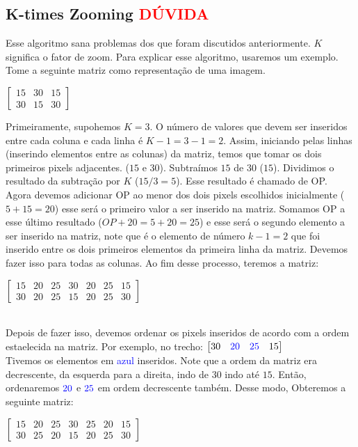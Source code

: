 \documentclass[a4paper, 12pt]{article}
\begin{document}
\subsection{K-times Zooming \textcolor{red}{DÚVIDA}}
Esse algoritmo sana problemas dos que foram discutidos anteriormente. $K$ significa o fator de zoom.
Para explicar esse algoritmo, usaremos um exemplo. Tome a seguinte matriz como representação de uma imagem.
\begin{table}[!htbp]
	\centering
	$
	\begin{bmatrix}
	15 & 30 & 15 \\
	30 & 15 & 30
	\end{bmatrix}
	$
\end{table}
Primeiramente, supohemos $K = 3$. O número de valores que devem ser inseridos entre cada coluna e cada linha é $K - 1 = 3 - 1 = 2$.
Assim, iniciando pelas linhas (inserindo elementos entre as colunas) da matriz, temos que tomar os dois primeiros pixels 
adjacentes. ($15$ e $30$).
Subtraímos $15$ de $30$ ($15$). Dividimos o resultado da subtração por $K$ ($15/3 = 5$). Esse resultado é chamado de OP.
Agora devemos adicionar OP ao menor dos dois pixels escolhidos inicialmente ($5 + 15 = 20$) esse será o primeiro valor 
a ser inserido na matriz. Somamos OP a esse último resultado ($OP + 20 = 5 + 20 = 25$) e esse será o segundo elemento a ser
inserido na matriz, note que é o elemento de número $k - 1 = 2$ que foi inserido entre os dois primeiros elementos da primeira 
linha da matriz. Devemos fazer isso para todas as colunas. Ao fim desse processo, teremos a matriz:
\begin{table}[!htbp]
	\centering
	$
	\begin{bmatrix}
	15 & 20 & 25 & 30 & 20 & 25 & 15 \\
	30 & 20 & 25 & 15 & 20 & 25 & 30
	\end{bmatrix}
	$
\end{table}
\\
Depois de fazer isso, devemos ordenar os pixels inseridos de acordo com a ordem estaelecida na matriz. Por exemplo, no trecho:
$\begin{bmatrix}
	30 & \textcolor{blue}{20} & \textcolor{blue}{25} & 15	
\end{bmatrix}
$
\\
Tivemos os elementos em \textcolor{blue}{azul} inseridos. Note que a ordem da matriz era decrescente, da esquerda para a direita, indo 
de $30$ indo até $15$. Então, ordenaremos $\textcolor{blue}{20}$ e $\textcolor{blue}{25}$ em ordem decrescente também. Desse modo, 
Obteremos a seguinte matriz:
\begin{table}[!htbp]
	\centering
	$
	\begin{bmatrix}
	15 & 20 & 25 & 30 & 25 & 20 & 15 \\
	30 & 25 & 20 & 15 & 20 & 25 & 30
	\end{bmatrix}
	$
\end{table}
\\
\end{document}
